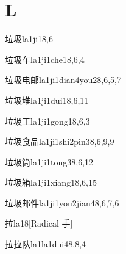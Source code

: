 
\section*{L}

\begin{entry}{垃圾}{la1ji1}{8,6}
\end{entry}

\begin{entry}{垃圾车}{la1ji1che1}{8,6,4}
\end{entry}

\begin{entry}{垃圾电邮}{la1ji1dian4you2}{8,6,5,7}
\end{entry}

\begin{entry}{垃圾堆}{la1ji1dui1}{8,6,11}
\end{entry}

\begin{entry}{垃圾工}{la1ji1gong1}{8,6,3}
\end{entry}

\begin{entry}{垃圾食品}{la1ji1shi2pin3}{8,6,9,9}
\end{entry}

\begin{entry}{垃圾筒}{la1ji1tong3}{8,6,12}
\end{entry}

\begin{entry}{垃圾箱}{la1ji1xiang1}{8,6,15}
\end{entry}

\begin{entry}{垃圾邮件}{la1ji1you2jian4}{8,6,7,6}
\end{entry}

\begin{entry}{拉}{la1}{8}[Radical 手]
\end{entry}

\begin{entry}{拉拉队}{la1la1dui4}{8,8,4}
\end{entry}

